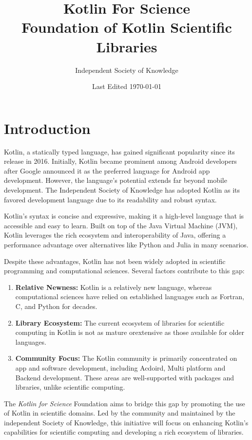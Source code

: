 \documentclass[10pt,twocolumn, a4paper]{article}
\title{Kotlin For Science \\ \large Foundation of Kotlin Scientific Libraries}
\author{Independent Society of Knowledge}
\date{Last Edited \today}
\begin{document}
	\maketitle
	\section{Introduction}
		Kotlin, a statically typed language, has gained significant popularity since its release in 2016. 
		Initially, Kotlin became prominent among Android developers after Google announced it as the preferred language for Android app development. 
		However, the language's potential extends far beyond mobile development. 
		The Independent Society of Knowledge has adopted Kotlin as its favored development language due to its readability and robust syntax.

		Kotlin's syntax is concise and expressive, making it a high-level language that is accessible and easy to learn. 
		Built on top of the Java Virtual Machine (JVM), Kotlin leverages the rich ecosystem and interoperability of Java, offering a performance advantage over alternatives like Python and Julia in many scenarios.

		Despite these advantages, Kotlin has not been widely adopted in scientific programming and computational sciences. Several factors contribute to this gap:
		\begin{enumerate}
			\item \textbf{Relative Newness:} Kotlin is a relatively new language, whereas computational sciences have relied on established languages such as Fortran, C, and Python for decades.
			\item \textbf{Library Ecosystem:} The current ecosystem of libraries for scientific computing in Kotlin is not as mature orextensive as those available for older languages.
			\item \textbf{Community Focus:} The Kotlin community is primarily concentrated on app and software development, including Acdoird, Multi platform and Backend development. These areas are well-supported with packages and libraries, unlike scientific computing.
		\end{enumerate}
		The \textit{Kotlin for Science} Foundation aims to bridge this gap by promoting the use of Kotlin in scientific domains. Led by the community and maintained by the independent Society of Knowledge, this initiative will focus on enhancing Kotlin's capabilities for scientific computing and developing a rich ecosystem of libraries.
\end{document}
